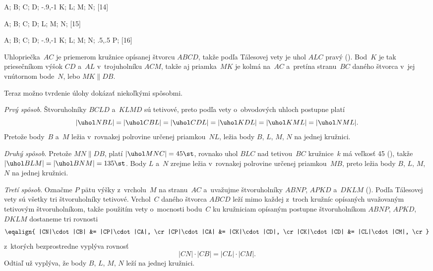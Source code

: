 {%
\fontplace
\tlpoint A; \blpoint B; \brpoint C; \trpoint D;
\ltpoint\xy-.9,-1 K; \rBpoint L; \tpoint M; \bpoint N;
[14] \hfil\Obr

\fontplace
\tlpoint A; \blpoint B; \brpoint C; \trpoint D;
\rBpoint L; \tpoint M; \bpoint N;
[15] \hfil\Obr

\fontplace
\tlpoint A; \blpoint B; \brpoint C; \trpoint D;
\ltpoint\xy-.9,-1 K; \rBpoint L; \tpoint M; \bpoint N;
\bpoint\xy.5,.5 P;
[16] \hfil\Obr

Uhlopriečka~$AC$ je priemerom kružnice opísanej štvorcu $ABCD$, takže
podľa Tálesovej vety je uhol $ALC$ pravý (\obr). Bod~$K$ je tak
priesečníkom výšok $CD$ a~$AL$ v~trojuholníku $ACM$, takže aj priamka~$MK$
je kolmá na~$AC$ a~pretína stranu~$BC$ daného štvorca
v~jej vnútornom bode~$N$, lebo $MK\parallel DB$.
\inspicture{}

Teraz možno tvrdenie úlohy dokázať niekoľkými spôsobmi.

\smallskip
{\it Prvý spôsob\/}.
Štvoruholníky $BCLD$ a~$KLMD$ sú tetivové, preto podľa vety
o~obvodových uhloch postupne platí
$$
|\uhol NBL|=|\uhol CBL|=|\uhol CDL|=|\uhol KDL|
            =|\uhol KML|=|\uhol NML|.
$$
Pretože body~$B$ a~$M$ ležia v~rovnakej polrovine určenej
priamkou~$NL$, ležia body $B$, $L$, $M$, $N$ na jednej kružnici.

\smallskip
{\it Druhý spôsob\/}.
Pretože $MN\parallel DB$, platí $|\uhol MNC|=45\st$, rovnako uhol
$BLC$ nad tetivou~$BC$ kružnice~$k$ má veľkosť 45\st{} (\obr),
\inspicture{}
takže $|\uhol BLM|=|\uhol BNM|=135\st$. Body $L$ a~$N$ zrejme
ležia v~rovnakej polrovine určenej priamkou~$MB$, preto ležia body $B$,
$L$, $M$, $N$ na jednej kružnici.


\smallskip
{\it Tretí spôsob\/}.
Označme $P$ pätu výšky z~vrcholu~$M$ na stranu~$AC$
a~uvažujme štvoruholníky $ABNP$, $APKD$ a~$DKLM$ (\obr). Podľa
\inspicture{}
Tálesovej vety sú všetky tri štvoruholníky tetivové. Vrchol~$C$
daného štvorca $ABCD$ leží mimo každej z~troch kružníc opísaných
uvažovaným tetivovým štvoruholníkom, takže použitím vety o~mocnosti
bodu~$C$ ku kružniciam opísaným postupne štvoruholníkom $ABNP$,
$APKD$, $DKLM$ dostaneme tri rovnosti
$$
\eqalign{
  |CN|\cdot |CB| &= |CP|\cdot |CA|, \cr
  |CP|\cdot |CA| &= |CK|\cdot |CD|, \cr
  |CK|\cdot |CD| &= |CL|\cdot |CM|, \cr
}
$$
z~ktorých bezprostredne vyplýva rovnosť
$$
|CN|\cdot |CB|=|CL|\cdot |CM|.
$$
Odtiaľ už vyplýva, že body $B$, $L$, $M$, $N$ leží na jednej kružnici.}

